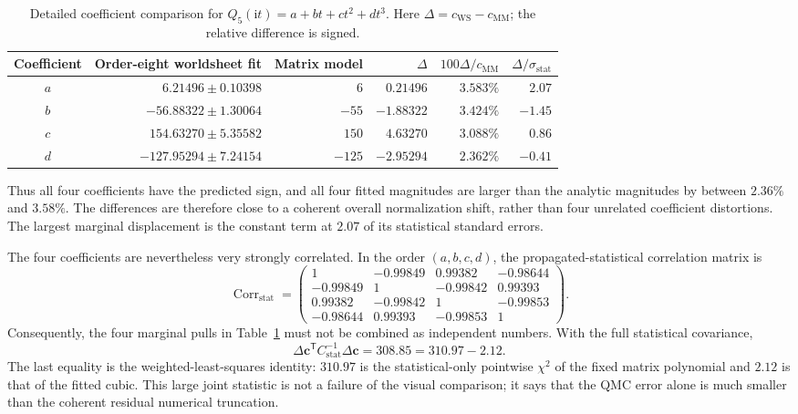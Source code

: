\documentclass[11pt]{article}
\newcommand{\ii}{\mathrm{i}}
\begin{document}
\begin{table}[H]
\centering
\small
\caption{Detailed coefficient comparison for
$Q_5(\ii t)=a+bt+ct^2+dt^3$.  Here
$\Delta=c_{\mathrm{WS}}-c_{\mathrm{MM}}$; the relative difference is signed.}
\label{tab:Q5-order8-coefficients}
\begin{tabular}{@{}c r r r r r@{}}
\toprule
Coefficient & Order-eight worldsheet fit & Matrix model & $\Delta$
& $100\Delta/c_{\mathrm{MM}}$ & $\Delta/\sigma_{\mathrm{stat}}$ \\
\midrule
$a$ & $  6.21496\pm0.10398$ & $   6$ & $ 0.21496$ & $3.583\%$ & $ 2.07$ \\
$b$ & $-56.88322\pm1.30064$ & $ -55$ & $-1.88322$ & $3.424\%$ & $-1.45$ \\
$c$ & $154.63270\pm5.35582$ & $ 150$ & $ 4.63270$ & $3.088\%$ & $ 0.86$ \\
$d$ & $-127.95294\pm7.24154$ & $-125$ & $-2.95294$ & $2.362\%$ & $-0.41$ \\
\bottomrule
\end{tabular}
\end{table}

Thus all four coefficients have the predicted sign, and all four fitted
magnitudes are larger than the analytic magnitudes by between $2.36\%$ and
$3.58\%$.  The differences are therefore close to a coherent overall
normalization shift, rather than four unrelated coefficient distortions.
The largest marginal displacement is the constant term at $2.07$ of its
statistical standard errors.

The four coefficients are nevertheless very strongly correlated.  In the
order $(a,b,c,d)$, the propagated-statistical correlation matrix is
\begin{equation}
 \operatorname{Corr}_{\mathrm{stat}}=
 \begin{pmatrix}
  1       &-0.99849& 0.99382&-0.98644\\
 -0.99849& 1       &-0.99842& 0.99393\\
  0.99382&-0.99842& 1       &-0.99853\\
 -0.98644& 0.99393&-0.99853& 1
 \end{pmatrix}.
 \label{eq:Q5-order8-coefficient-correlation}
\end{equation}
Consequently, the four marginal pulls in
Table~\ref{tab:Q5-order8-coefficients} must not be combined as independent
numbers.  With the full statistical covariance,
\begin{equation}
 \Delta\boldsymbol c^{\mathsf T}C_{\mathrm{stat}}^{-1}
 \Delta\boldsymbol c
 =308.85
 =310.97-2.12.
 \label{eq:Q5-order8-coefficient-joint-stat}
\end{equation}
The last equality is the weighted-least-squares identity: $310.97$ is the
statistical-only pointwise $\chi^2$ of the fixed matrix polynomial and
$2.12$ is that of the fitted cubic.  This large joint statistic is not a
failure of the visual comparison; it says that the QMC error alone is much
smaller than the coherent residual numerical truncation.
\end{document}
